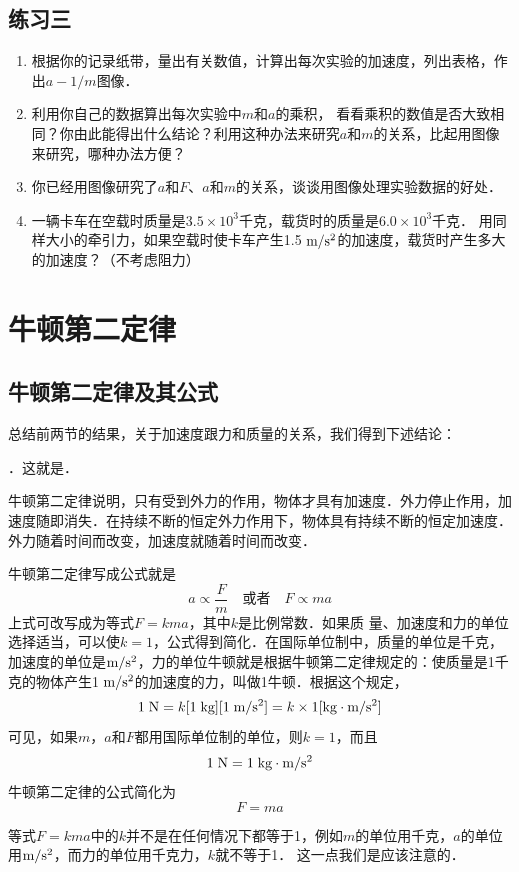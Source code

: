 \subsection*{练习三}
\begin{enumerate}
    \item 根据你的记录纸带，量出有关数值，计算出每次实验的加速度，列出表格，作出$a-1/m$图像．
\item 利用你自己的数据算出每次实验中$m$和$a$的乘积，
看看乘积的数值是否大致相同？你由此能得出什么结论？利用这种办法来研究$a$和$m$的关系，比起用图像来研究，哪种办法方便？
\item 你已经用图像研究了$a$和$F$、$a$和$m$的关系，谈谈用图像处理实验数据的好处．
\item 一辆卡车在空载时质量是$3.5\times 10^3$千克，载货时的质量是$6.0\times 10^3$千克．
用同样大小的牵引力，如果空载时使卡车产生1.5$\;\text{m}/\text{s}^2$的加速度，载货时产生多大的加速度？（不考虑阻力）
\end{enumerate}

\section{牛顿第二定律}
\subsection{牛顿第二定律及其公式}

总结前两节的结果，关于加速度跟力和质量的关系，我们得到下述结论：

．这就是．

牛顿第二定律说明，只有受到外力的作用，物体才具有加速度．外力停止作用，加速度随即消失．在持续不断的恒定外力作用下，物体具有持续不断的恒定加速度．外力随着时间而改变，加速度就随着时间而改变．

牛顿第二定律写成公式就是
\[a\propto \frac{F}{m}\quad \text{或者}\quad F\propto ma \]
上式可改写成为等式$F=kma$，其中$k$是比例常数．如果质
量、加速度和力的单位选择适当，可以使$k=1$，公式得到简化．在国际单位制中，质量的单位是千克，加速度的单位是$\text{m}/\text{s}^2$，力的单位牛顿就是根据牛顿第二定律规定的：使质量是1千克的物体产生1$\;\text{m}/\text{s}^2$的加速度的力，叫做1牛顿．根据这个规定，
\[1 \;\text{N}=k[1\;\text{kg}][1\;\text{m}/\text{s}^2]=k\times 1[{\rm kg}\cdot \text{m}/\text{s}^2]\]
可见，如果$m$，$a$和$F$都用国际单位制的单位，则$k=1$，而且
\[1 \;\text{N}=1 \;\text{kg} \cdot \text{m}/\text{s}^2\]
牛顿第二定律的公式简化为
\[F=ma\]

等式$F=kma$中的$k$并不是在任何情况下都等于1，例如$m$的单位用千克，$a$的单位用$\text{m}/\text{s}^2$，而力的单位用千克力，$k$就不等于1．
这一点我们是应该注意的．


